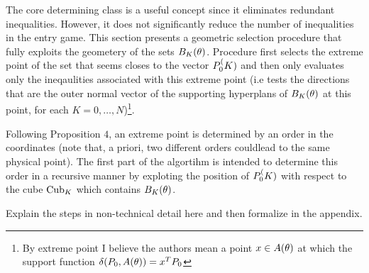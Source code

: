 The core determining class is a useful concept since it eliminates redundant inequalities. However, it does not significantly reduce the number of inequalities in the entry game. This section presents a geometric selection procedure that fully exploits the geometery of the sets $B_K(\theta)$. Procedure first selects the extreme point of the set that seems closes to the vector $P_0^(K)$ and then only evaluates only the ineqaulities associated with this extreme point (i.e tests the directions that are the outer normal vector of the supporting hyperplans of $B_K(\theta)$ at this point, for each $K = 0, \dots, N$)\footnote{By extreme point I believe the authors mean a point $x \in A(\theta)$ at which the support function $\delta(P_0, A(\theta))= x^T P_0$}.

Following Proposition $4$, an extreme point is determined by an order in the coordinates (note that, a priori, two different orders couldlead to the same physical point). The first part of the algortihm is intended to determine this order in a recursive manner by exploting the position of $P_0^(K)$ with respect to the cube $\operatorname{Cub}_K$ which contains $B_K(\theta)$. 

Explain the steps in non-technical detail here and then formalize in the appendix.

